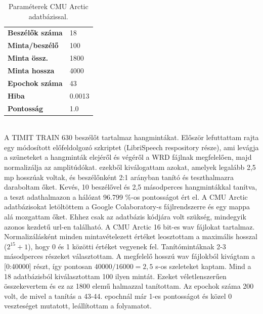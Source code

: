 \begin{table}[!ht]
	\begin{tabular}{l|l} \toprule
		\bfseries Beszélők száma & 18 \\
		\rowcolor{gray!10}
		\bfseries Minta/beszélő & 100\\
		\bfseries Minta össz. & 1800 \\
		\rowcolor{gray!10}
		\bfseries Minta hossza & 4000 \\
		\bfseries Epochok száma & 43\\
		\rowcolor{gray!10}
		\bfseries Hiba & 0.0013 \\ 
		\bfseries Pontosság & 1.0 \\ 
		\bottomrule
		\hline
	\end{tabular}
	\centering
	\caption{Paraméterek CMU Arctic adatbázissal.}
	\label{fig:wavenet-arctic}
\end{table}
\ \\
A TIMIT TRAIN 630 beszélőt tartalmaz hangmintákat. Először lefuttattam rajta egy módosított előfeldolgozó szkriptet (LibriSpeech respository része), ami levágja a szüneteket a hangminták elejéről és végéről a WRD fájlnak megfelelően, majd normalizálja az amplitúdókat. ezekből kiválogattam azokat, amelyek legalább 2,5 mp hosszúak voltak, és beszélőnként 2:1 arányban tanító és teszthalmazra daraboltam őket.
Kevés, 10 beszélővel és 2,5 másodperces hangmintákkal tanítva, a teszt adathalmazon a hálózat 96.799 \%-os pontosságot ért el.
\newline
\newline
A CMU Arctic adatbázisokat letöltöttem a Google Colaboratory-s fájlrendszerre és egy mappa alá mozgattam őket. Ehhez csak az adatbázis kódjára volt szükség, mindegyik azonos kezdetű url-en található.
A CMU Arctic 16 bit-es wav fájlokat tartalmaz. Normalizálásként minden mintavételezett értéket leosztottam a maximális hosszal ($2^15 + 1$), hogy 0 és 1 közötti értéket vegyenek fel.
\newline
\newline
Tanítómintáknak 2-3 másodperces részeket választottam. A megfelelő hosszú wav fájlokból kivágtam a [0:40000] részt, így pontosan $40000/16000 = 2,5$ s-os szeleteket kaptam. Mind a 18 adatbázisból kiválasztottam 100 ilyen mintát. Ezeket véletlenszerűen összekevertem és ez az 1800 elemű halmazzal tanítottam. Az epochok száma 200 volt, de mivel a tanítás a 43-44. epochnál már 1-es pontosságot és közel 0 veszteséget mutatott, leállítottam a folyamatot. 
\newline
\newline

